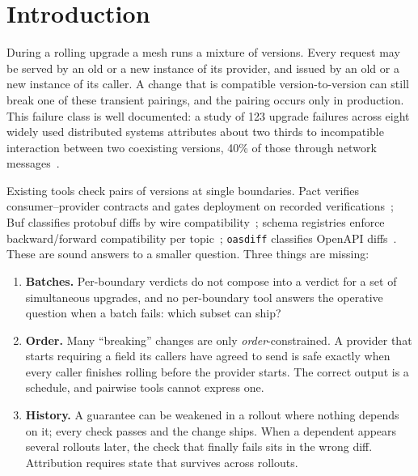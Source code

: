 \maketitle


\section{Introduction}
\label{sec:intro}

During a rolling upgrade a mesh runs a mixture of versions. Every
request may be served by an old or a new instance of its provider, and
issued by an old or a new instance of its caller. A change that is
compatible version-to-version can still break one of these transient
pairings, and the pairing occurs only in production. This failure
class is well documented: a study of 123 upgrade failures across eight
widely used distributed systems attributes about two thirds to
incompatible interaction between two coexisting versions, 40\% of
those through network messages~\cite{zhang2021understanding}.

Existing tools check pairs of versions at single boundaries. Pact
verifies consumer--provider contracts and gates deployment on recorded
verifications~\cite{pactcanideploy}; Buf classifies protobuf diffs by
wire compatibility~\cite{bufbreaking}; schema registries enforce
backward/forward compatibility per topic~\cite{confluentcompat};
\texttt{oasdiff} classifies OpenAPI diffs~\cite{oasdiff}. These are
sound answers to a smaller question. Three things are missing:

\begin{enumerate}
\item \textbf{Batches.} Per-boundary verdicts do not compose into a
  verdict for a set of simultaneous upgrades, and no per-boundary tool
  answers the operative question when a batch fails: which subset can
  ship?
\item \textbf{Order.} Many ``breaking'' changes are only
  \emph{order}-constrained. A provider that starts requiring a field
  its callers have agreed to send is safe exactly when every caller
  finishes rolling before the provider starts. The correct output is a
  schedule, and pairwise tools cannot express one.
\item \textbf{History.} A guarantee can be weakened in a rollout where
  nothing depends on it; every check passes and the change ships. When
  a dependent appears several rollouts later, the check that finally
  fails sits in the wrong diff. Attribution requires state that
  survives across rollouts.
\end{enumerate}

